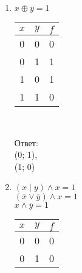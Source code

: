     \begin{spacing}{1.5}
        \begin{minipage}[t]{0.3\textwidth}
            \begin{enumerate}
                \item $x \oplus y = 1$\\
                \begin{spacing}{4.5}\end{spacing}
                \begin{spacing}{1}
                    \begin{tabular}{|c|c|c|}
                        \hline
                        $x$ & $y$ & $f$ \\
                        \hline
                        0   & 0   & 0   \\
                        \hline
                        0   & 1   & 1   \\
                        \hline
                        1   & 0   & 1   \\
                        \hline
                        1   & 1   & 0   \\
                        \hline
                    \end{tabular}\\
                \end{spacing}
                Ответ: \\(0; 1),\\ (1; 0)
            \end{enumerate}
        \end{minipage}
        \begin{minipage}[t]{0.3\textwidth}
            \begin{enumerate}
                \setcounter{enumi}{1}
                \item $(x \mid y) \wedge x = 1$\\
                $(\overline x \vee \overline y) \wedge x = 1$\\
                $x \wedge \overline y = 1$\\
                \begin{spacing}{1}
                    \begin{tabular}{|c|c|c|}
                        \hline
                        $x$ & $y$ & $f$ \\
                        \hline
                        0   & 0   & 0   \\
                        \hline
                        0   & 1   & 0   \\

\end{tabular}
\end{spacing}
\end{enumerate}
\end{minipage}
\end{spacing}
